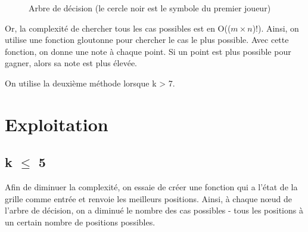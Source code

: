 \documentclass[12pt, a4paper]{article}
\begin{document}
\begin{figure}[t]
\centering
{}
\cleargoban
{}

\caption{Arbre de décision (le cercle noir est le symbole du premier joueur)} \label{fig:arbre}
\end{figure}

Or, la complexité de chercher tous les cas possibles est en O(($m \times n$)!). Ainsi, on utilise une fonction gloutonne pour chercher le cas le \og plus \fg possible. Avec cette fonction, on donne une note à chaque point. Si un point est plus possible pour gagner, alors sa note est plus élevée.\par
On utilise la deuxième méthode lorsque k > 7.

\section{Exploitation}
\subsection{k $\le$ 5}
Afin de diminuer la complexité, on essaie de créer une fonction qui a l'état de la grille comme entrée et renvoie les meilleurs positions. Ainsi, à chaque nœud de l'arbre de décision, on a diminué le nombre des cas possibles - tous les positions à un certain nombre de positions possibles.
\end{document}
